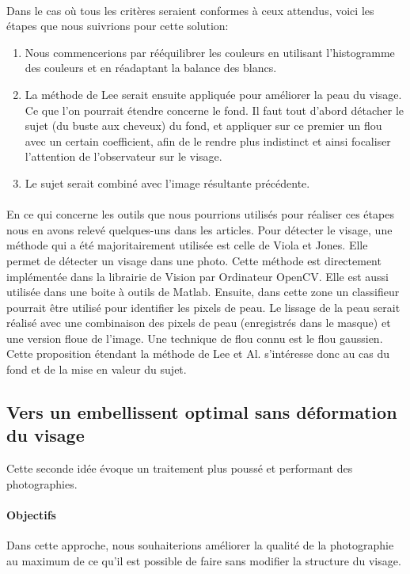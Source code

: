 \documentclass[11pt, french]{report-rd-info}
\begin{document}
\paragraph{}
Dans le cas où tous les critères seraient conformes à ceux attendus, voici les étapes que nous suivrions pour cette solution:
\begin{enumerate}
\item Nous commencerions par rééquilibrer les couleurs en utilisant l’histogramme des couleurs et en réadaptant la balance des blancs.
\item La méthode de Lee serait ensuite appliquée pour améliorer la peau du visage. Ce que l’on pourrait étendre concerne le fond. Il faut tout d’abord détacher le sujet (du buste aux cheveux) du fond, et appliquer sur ce premier un flou avec un certain coefficient, afin de le rendre plus indistinct et ainsi focaliser l’attention de l’observateur sur le visage.
\item Le sujet serait combiné avec l’image résultante précédente.
\end{enumerate}
\paragraph{}
En ce qui concerne les outils que nous pourrions utilisés pour réaliser ces étapes nous en avons relevé quelques-uns dans les articles. Pour détecter le visage, une méthode qui a été majoritairement utilisée est celle de Viola et Jones. Elle permet de détecter un visage dans une photo. Cette méthode est directement implémentée dans la librairie de Vision par Ordinateur OpenCV. Elle est aussi utilisée dans une boite à outils de Matlab. Ensuite, dans cette zone un classifieur pourrait être utilisé pour identifier les pixels de peau.
Le lissage de la peau serait réalisé avec une combinaison des pixels de peau (enregistrés dans le masque) et une version floue de l’image. Une technique de flou connu est le flou gaussien.
Cette proposition étendant la méthode de Lee et Al. s’intéresse donc au cas du fond et de la mise en valeur du sujet.
\subsection{Vers un embellissent optimal sans déformation du visage}
\label{propdeux}
Cette seconde idée évoque un traitement plus poussé et performant des photographies.
\paragraph{Objectifs}
Dans cette approche, nous souhaiterions améliorer la qualité de la photographie au maximum de ce qu’il est possible de faire sans modifier la structure du visage.
\end{document}

